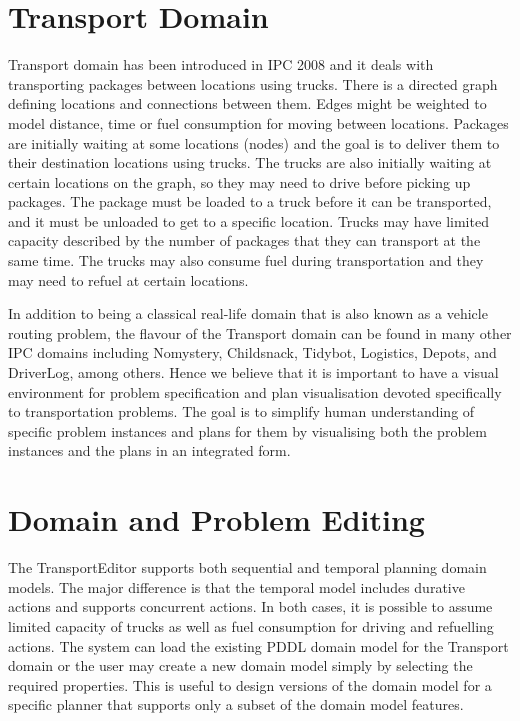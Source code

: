 \documentclass[letterpaper]{article}
\begin{document}
\section{Transport Domain}
Transport domain has been introduced in IPC 2008 and it deals with transporting packages between locations using trucks. There is a directed graph defining locations and connections between them. Edges might be weighted to model distance, time or fuel consumption for moving between locations. Packages are initially waiting at some locations (nodes) and the goal is to deliver them to their destination locations using trucks. The trucks are also initially waiting at certain locations on the graph, so they may need to drive before picking up packages. The package must be loaded to a truck before it can be transported, and it must be unloaded to get to a specific location. Trucks may have limited capacity described by the number of packages that they can transport at the same time. The trucks may also consume fuel during transportation and they may need to refuel at certain locations.

In addition to being a classical real-life domain that is also known as a vehicle routing problem, the flavour of the Transport domain can be found in many other IPC domains including Nomystery, Childsnack, Tidybot, Logistics, Depots, and DriverLog,  among others. Hence we believe that it is important to have a visual environment for problem specification and plan visualisation devoted specifically to transportation problems. The goal is to simplify human understanding of specific problem instances and plans for them by visualising both the problem instances and the plans in an integrated form. 


\section{Domain and Problem Editing}
The TransportEditor supports both sequential and temporal planning domain models. The major difference is that the temporal model includes durative actions and supports concurrent actions. In both cases, it is possible to assume limited capacity of trucks as well as fuel consumption for driving and refuelling actions. The system can load the existing PDDL domain model for the Transport domain or the user may create a new domain model simply by selecting the required properties. This is useful to design versions of the domain model for a specific planner that supports only a subset of the domain model features.
\end{document}
